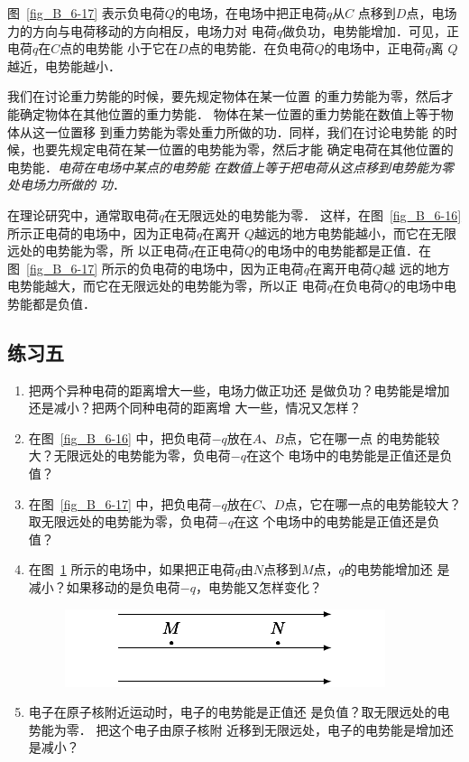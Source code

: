 图~\ref{fig_B_6-17} 表示负电荷$Q$的电场，在电场中把正电荷$q$从$C$
点移到$D$点，电场力的方向与电荷移动的方向相反，电场力对
电荷$q$做负功，电势能增加．可见，正电荷$q$在$C$点的电势能
小于它在$D$点的电势能．在负电荷$Q$的电场中，正电荷$q$离
$Q$越近，电势能越小．

我们在讨论重力势能的时候，要先规定物体在某一位置
的重力势能为零，然后才能确定物体在其他位置的重力势能．
物体在某一位置的重力势能在数值上等于物体从这一位置移
到重力势能为零处重力所做的功．同样，我们在讨论电势能
的时候，也要先规定电荷在某一位置的电势能为零，然后才能
确定电荷在其他位置的电势能．\textit{电荷在电场中某点的电势能
在数值上等于把电荷从这点移到电势能为零处电场力所做的
功}．

在理论研究中，通常取电荷$q$在无限远处的电势能为零．
这样，在图~\ref{fig_B_6-16} 所示正电荷的电场中，因为正电荷$q$在离开
$Q$越远的地方电势能越小，而它在无限远处的电势能为零，所
以正电荷$q$在正电荷$Q$的电场中的电势能都是正值．在图~\ref{fig_B_6-17} 
所示的负电荷的电场中，因为正电荷$q$在离开电荷$Q$越
远的地方电势能越大，而它在无限远处的电势能为零，所以正
电荷$q$在负电荷$Q$的电场中电势能都是负值．


\subsection*{练习五}

\begin{enumerate}
    \item 把两个异种电荷的距离增大一些，电场力做正功还
是做负功？电势能是增加还是减小？把两个同种电荷的距离增
大一些，情况又怎样？
\item 在图~\ref{fig_B_6-16} 中，把负电荷$-q$放在$A$、$B$点，它在哪一点
的电势能较大？无限远处的电势能为零，负电荷$-q$在这个
电场中的电势能是正值还是负值？
\item 在图~\ref{fig_B_6-17} 中，把负电荷$-q$放在$C$、$D$点，它在哪一点的电势能较大？取无限远处的电势能为零，负电荷$-q$在这
个电场中的电势能是正值还是负值？
\item 在图~\ref{fig_B_6-18} 所示的电场中，如果把正电荷$q$由$N$点移到$M$点，$q$的电势能增加还
是减小？如果移动的是负电荷$-q$，电势能又怎样变化？
\begin{figure}[htbp]
    \centering
    \includegraphics{fig/B/6-18.pdf}
    \caption{}\label{fig_B_6-18}
\end{figure}    

\item  电子在原子核附近运动时，电子的电势能是正值还
是负值？取无限远处的电势能为零．
把这个电子由原子核附
近移到无限远处，电子的电势能是增加还是减小？
\end{enumerate}



